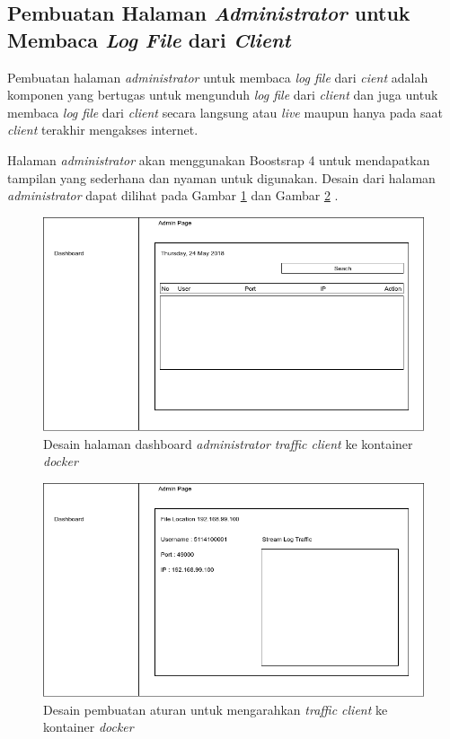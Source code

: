 \subsection{Pembuatan Halaman \textit{Administrator} untuk Membaca \textit{Log File} dari \textit{Client}}
Pembuatan halaman \textit{administrator} untuk membaca \textit{log file} dari \textit{cient} adalah komponen yang bertugas untuk mengunduh \textit{log file} dari \textit{client} dan juga untuk membaca \textit{log file} dari \textit{client} secara langsung atau \textit{live} maupun hanya pada saat \textit{client} terakhir mengakses internet.

Halaman \textit{administrator} akan menggunakan Boostsrap 4 untuk mendapatkan tampilan yang sederhana dan nyaman untuk digunakan. Desain dari halaman \textit{administrator} dapat dilihat pada Gambar \ref{desaindashboard} dan Gambar \ref{desainstream} .

\begin{figure}[H]
	\centering
	\includegraphics[width=\linewidth]{images/bab3/desaindashboard}
	\caption{Desain halaman dashboard \textit{administrator} \textit{traffic client} ke kontainer \textit{docker}}
	\label{desaindashboard}
\end{figure}

\begin{figure}[H]
	\centering
	\includegraphics[width=\linewidth]{images/bab3/desainstream}
	\caption{Desain pembuatan aturan untuk mengarahkan \textit{traffic client} ke kontainer \textit{docker}}
	\label{desainstream}
\end{figure}


